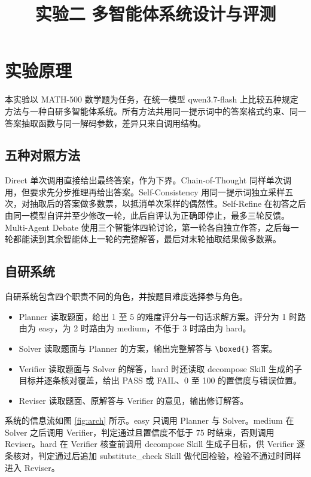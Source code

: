 \documentclass[12pt]{ctexart}
\title{实验二 多智能体系统设计与评测}
\author{}
\date{}
\begin{document}
\maketitle

\section{实验原理}

本实验以 MATH-500 数学题为任务，在统一模型 qwen3.7-flash 上比较五种规定方法与一种自研多智能体系统。所有方法共用同一提示词中的答案格式约束、同一答案抽取函数与同一解码参数，差异只来自调用结构。

\subsection{五种对照方法}

Direct 单次调用直接给出最终答案，作为下界。Chain-of-Thought 同样单次调用，但要求先分步推理再给出答案。Self-Consistency 用同一提示词独立采样五次，对抽取后的答案做多数票，以抵消单次采样的偶然性。Self-Refine 在初答之后由同一模型自评并至少修改一轮，此后自评认为正确即停止，最多三轮反馈。Multi-Agent Debate 使用三个智能体四轮讨论，第一轮各自独立作答，之后每一轮都能读到其余智能体上一轮的完整解答，最后对末轮抽取结果做多数票。

\subsection{自研系统}

自研系统包含四个职责不同的角色，并按题目难度选择参与角色。

\begin{itemize}
  \item Planner 读取题面，给出 1 至 5 的难度评分与一句话求解方案。评分为 1 时路由为 easy，为 2 时路由为 medium，不低于 3 时路由为 hard。
  \item Solver 读取题面与 Planner 的方案，输出完整解答与 \verb|\boxed{}| 答案。
  \item Verifier 读取题面与 Solver 的解答，hard 时还读取 decompose Skill 生成的子目标并逐条核对覆盖，给出 PASS 或 FAIL、0 至 100 的置信度与错误位置。
  \item Reviser 读取题面、原解答与 Verifier 的意见，输出修订解答。
\end{itemize}

系统的信息流如图 \ref{fig:arch} 所示。easy 只调用 Planner 与 Solver。medium 在 Solver 之后调用 Verifier，判定通过且置信度不低于 75 时结束，否则调用 Reviser。hard 在 Verifier 核查前调用 decompose Skill 生成子目标，供 Verifier 逐条核对，判定通过后追加 substitute\_check Skill 做代回检验，检验不通过时同样进入 Reviser。
\end{document}
